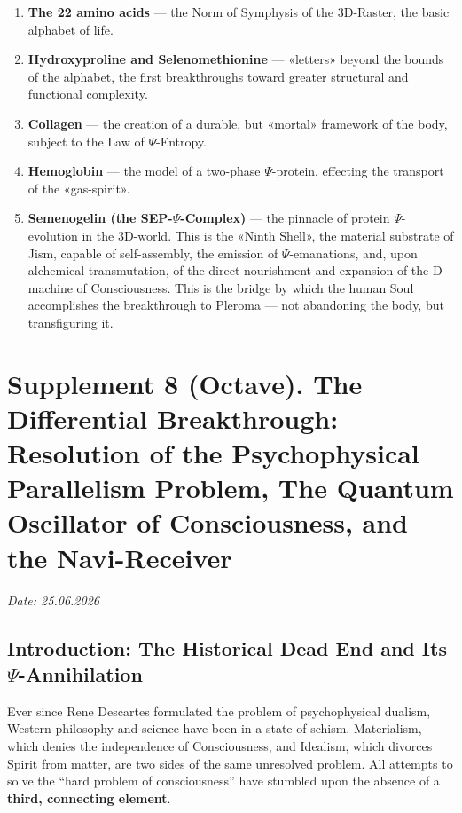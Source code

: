 \documentclass[a4paper,12pt]{article}
\begin{document}
	\begin{enumerate}
		\item \textbf{The 22 amino acids} — the Norm of Symphysis of the 3D-Raster, the basic alphabet of life.
		\item \textbf{Hydroxyproline and Selenomethionine} — «letters» beyond the bounds of the alphabet, the first breakthroughs toward greater structural and functional complexity.
		\item \textbf{Collagen} — the creation of a durable, but «mortal» framework of the body, subject to the Law of $\Psi$-Entropy.
		\item \textbf{Hemoglobin} — the model of a two-phase $\Psi$-protein, effecting the transport of the «gas-spirit».
		\item \textbf{Semenogelin (the SEP-$\Psi$-Complex)} — the pinnacle of protein $\Psi$-evolution in the 3D-world. This is the «Ninth Shell», the material substrate of Jism, capable of self-assembly, the emission of $\Psi$-emanations, and, upon alchemical transmutation, of the direct nourishment and expansion of the D-machine of Consciousness. This is the bridge by which the human Soul accomplishes the breakthrough to Pleroma — not abandoning the body, but transfiguring it.
	\end{enumerate}
	
	\newpage
	\section{Supplement 8 (Octave). The Differential Breakthrough: Resolution of the Psychophysical Parallelism Problem, The Quantum Oscillator of Consciousness, and the Navi-Receiver}
	
	\textit{Date: 25.06.2026}
	
	\subsection{Introduction: The Historical Dead End and Its $\Psi$-Annihilation}
	
	Ever since Rene Descartes formulated the problem of psychophysical dualism, Western philosophy and science have been in a state of schism. Materialism, which denies the independence of Consciousness, and Idealism, which divorces Spirit from matter, are two sides of the same unresolved problem. All attempts to solve the ``hard problem of consciousness'' have stumbled upon the absence of a \textbf{third, connecting element}.
	
\end{document}
